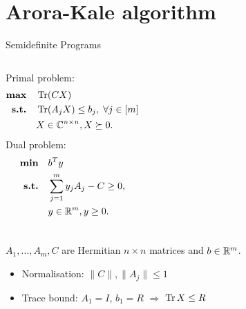 
\section{Arora-Kale algorithm}

\begin{frame}{Semidefinite Programs}
 \begin{columns}
  Primal problem:
  \begin{align*}
    \textbf{max} & \quad \operatorname{Tr}(CX) \\
    \textbf{s.t.} & \quad \operatorname{Tr}(A_j X) \leq b_j,\;\forall j \in [m] \\
		      & \quad X\in\mathbb{C}^{n\times n}, X \succeq 0.
  \end{align*}
  Dual problem:
  \begin{align*}
    \textbf{min} & \quad b^T y \\
    \textbf{s.t.} & \quad \sum_{j=1}^m y_j A_j - C \geq 0, \\
		      & \quad y \in\mathbb{R}^m, y \geq 0.
  \end{align*}
 \end{columns}
 
 \vspace{2\floatsep}
 
 $A_1,\dots,A_m,C$ are Hermitian $n\times n$ matrices and $b\in\mathbb{R}^m$.
 
 \vspace{\floatsep}
 
 \pause
 
 \begin{itemize}
  \item Normalisation: $\|C\|, \|A_j\| \leq 1$
  \item Trace bound: $A_1 = I$, $b_1 = R$ $\Rightarrow$ $\operatorname{Tr} X \leq R$
 \end{itemize}

\end{frame}


